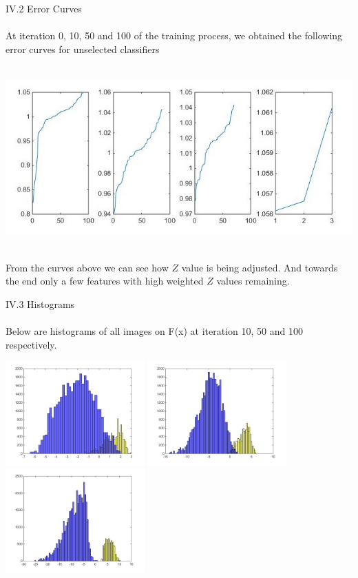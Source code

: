 \documentclass[12pt]{article}
\newenvironment{p3}[2][IV Realboost for Face Detection]{\begin{trivlist}
\item[\hskip \labelsep {\bfseries #1}\hskip \labelsep {\bfseries #2}]}{\end{trivlist}}
\begin{document}
\begin{p3}{}
\item{IV.2 Error Curves\\\\}
At iteration 0, 10, 50 and 100 of the training process, we obtained the following error curves for unselected classifiers
\begin{center}
		\includegraphics[height=7cm]{data/realboost_error_curve.jpg}
\end{center}
From the curves above we can see how $Z$ value is being adjusted. And towards the end only a few features with high weighted $Z$ values remaining.
\item{IV.3 Histograms\\\\}
Below are histograms of all images on F(x) at iteration 10, 50 and 100 respectively.
\begin{center}
		\includegraphics[height=4cm]{data/realboost_hist_10.jpg}
		\includegraphics[height=4cm]{data/realboost_hist_50.jpg}
		\includegraphics[height=4cm]{data/realboost_hist_100.jpg}

\end{center}
\end{p3}
\end{document}
